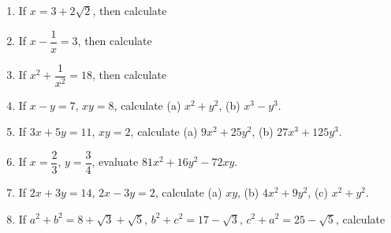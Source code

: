 \begin{enumerate}
\begin{enumerate}[label=(\alph*)]
\end{enumerate}
		\item If $x=3+2\sqrt{2}$, then
		calculate 		\begin{enumerate}[label=(\alph*)]
			\end{enumerate}
		\item If $x-\dfrac{1}{x}=3$, then calculate
		\begin{enumerate}[label=(\alph*)]
			\end{enumerate}
		\item If $x^2+\dfrac{1}{x^2}=18$, then calculate
		\begin{enumerate}[label=(\alph*)]
			\end{enumerate}
		\item If $x-y=7$, $xy=8$, calculate (a) $x^2+y^2$, (b) $x^3-y^3$.
		\item If $3x+5y=11$, $xy=2$, calculate (a) $9x^2+25y^2$, (b) $27x^3+125y^3$.
		\item If $x=\dfrac{2}{3}$, $y=\dfrac{3}{4}$, evaluate $81x^2+16y^2-72xy$.
		\item If $2x+3y=14$, $2x-3y=2$, calculate (a) $xy$, (b) $4x^2+9y^2$, (c) $x^2+y^2$.
		\item If \(a^2+b^2=8+\sqrt{3}+\sqrt{5}\), \(b^2+c^2=17-\sqrt{3}\), \(c^2+a^2=25-\sqrt{5}\), calculate 

\end{enumerate}
